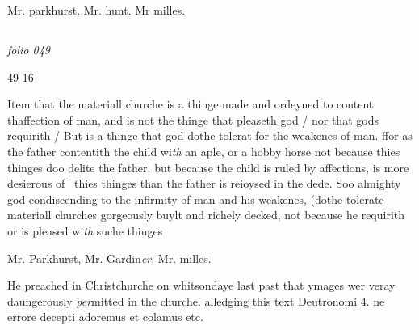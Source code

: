 \documentclass[12pt, a4paper]{book}
\begin{document}
               		
				\marginpar[\vspace{0.5cm}{\textcolor{Gray}{n}}]{}
			
               		
		\ifthenelse{\isodd{\thepage}}
		{\reversemarginpar}
		{\normalmarginpar}
		Mr. parkhurst. Mr. hunt. Mr milles.



\dotfill
					  \subsection*{}

\textit{folio 049}


\begin{flushright}{\color{Mahogany}49} 16\end{flushright}
	
		
				\marginpar[\vspace{0.5cm}{\textcolor{Gray}{seditious}}]{}
			
		
		\ifthenelse{\isodd{\thepage}}
		{\reversemarginpar}
		{\normalmarginpar}
		Item that the materiall churche is a thinge made
 and ordeyned to content thaffection of man, and is
 not the thinge that pleaseth god / nor that gods
 requirith / But is a thinge that god dothe tolerat
 for the weakenes of man. ffor as the father contentith
 the child wi\textit{th }an aple, or a hobby horse not because
 thies thinges doo delite the father. but because the
 child is ruled by affections, is more desierous of 
 thies thinges than the father is reioysed in the
 dede. Soo almighty god condiscending to the
 infirmity of man and his weakenes, (dothe
 tolerate materiall churches gorgeously buylt
 and richely decked, not because he requirith
 or is pleased wi\textit{th} suche thinges
	

	
				\marginpar[\vspace{0.5cm}{\textcolor{Gray}{+}}]{}
			
	
		\ifthenelse{\isodd{\thepage}}
		{\reversemarginpar}
		{\normalmarginpar}
		Mr. Parkhurst, Mr. Gardin\textit{er}. Mr. milles.

	
				\marginpar[\vspace{0.5cm}{\textcolor{Gray}{Images}}]{}
			
	
		\ifthenelse{\isodd{\thepage}}
		{\reversemarginpar}
		{\normalmarginpar}
		He preached in Christchurche on whitsondaye
 last past that ymages wer veray daungerously
 \textit{per}mitted in the churche. alledging this text
 Deutronomi 4. ne errore decepti adoremus
 et colamus etc.
			
\end{document}
